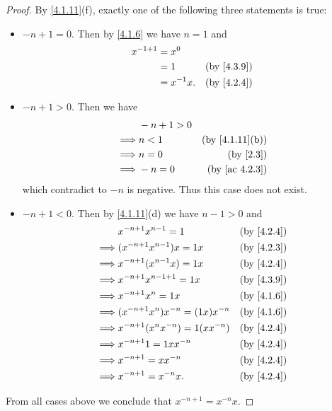 \begin{proof}
  By \cref{4.1.11}(f), exactly one of the following three statements is true:
  \begin{itemize}
    \item \(-n + 1 = 0\).
          Then by \cref{4.1.6} we have \(n = 1\) and
          \begin{align*}
            x^{-1 + 1} & = x^0                                  \\
                       & = 1         & \text{(by \cref{4.3.9})} \\
                       & = x^{-1} x. & \text{(by \cref{4.2.4})}
          \end{align*}
    \item \(-n + 1 > 0\).
          Then we have
          \begin{align*}
                     & -n + 1 > 0                                \\
            \implies & n < 1      & \text{(by \cref{4.1.11}(b))} \\
            \implies & n = 0      & \text{(by \cref{2.3})}       \\
            \implies & -n = 0     & \text{(by \cref{ac 4.2.3})}
          \end{align*}
          which contradict to \(-n\) is negative.
          Thus this case does not exist.
    \item \(-n + 1 < 0\).
          Then by \cref{4.1.11}(d) we have \(n - 1 > 0\) and
          \begin{align*}
                     & x^{-n + 1} x^{n - 1} = 1              & \text{(by \cref{4.2.4})} \\
            \implies & (x^{-n + 1} x^{n - 1}) x = 1x         & \text{(by \cref{4.2.3})} \\
            \implies & x^{-n + 1} (x^{n - 1} x) = 1x         & \text{(by \cref{4.2.4})} \\
            \implies & x^{-n + 1} x^{n - 1 + 1} = 1x         & \text{(by \cref{4.3.9})} \\
            \implies & x^{-n + 1} x^n = 1x                   & \text{(by \cref{4.1.6})} \\
            \implies & (x^{-n + 1} x^n) x^{-n} = (1x) x^{-n} & \text{(by \cref{4.1.6})} \\
            \implies & x^{-n + 1} (x^n x^{-n}) = 1(x x^{-n}) & \text{(by \cref{4.2.4})} \\
            \implies & x^{-n + 1} 1 = 1x x^{-n}              & \text{(by \cref{4.2.4})} \\
            \implies & x^{-n + 1} = x x^{-n}                 & \text{(by \cref{4.2.4})} \\
            \implies & x^{-n + 1} = x^{-n} x.                & \text{(by \cref{4.2.4})}
          \end{align*}
  \end{itemize}
  From all cases above we conclude that \(x^{-n + 1} = x^{-n} x\).
\end{proof}

